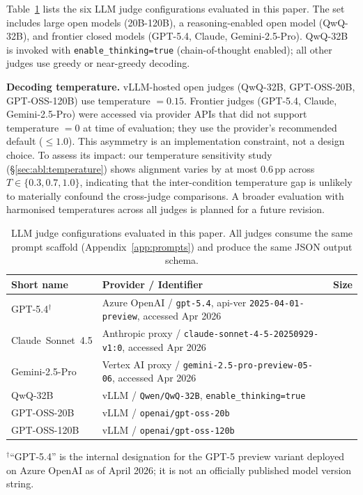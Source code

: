 Table~\ref{tab:judges} lists the six LLM judge configurations evaluated in this paper. The set includes large open models (20B-120B), a reasoning-enabled open model (QwQ-32B), and frontier closed models (GPT-5.4, Claude, Gemini-2.5-Pro). QwQ-32B is invoked with \texttt{enable\_thinking=true} (chain-of-thought enabled); all other judges use greedy or near-greedy decoding.

\textbf{Decoding temperature.} vLLM-hosted open judges (QwQ-32B, GPT-OSS-20B, GPT-OSS-120B) use temperature $=0.15$. Frontier judges (GPT-5.4, Claude, Gemini-2.5-Pro) were accessed via provider APIs that did not support temperature $=0$ at time of evaluation; they use the provider's recommended default ($\leq 1.0$). This asymmetry is an implementation constraint, not a design choice. To assess its impact: our temperature sensitivity study (\S\ref{sec:abl:temperature}) shows alignment varies by at most $0.6$\,pp across $T \in \{0.3, 0.7, 1.0\}$, indicating that the inter-condition temperature gap is unlikely to materially confound the cross-judge comparisons. A broader evaluation with harmonised temperatures across all judges is planned for a future revision.

\begin{table}[!htbp]
\centering
\caption{LLM judge configurations evaluated in this paper. All judges consume the same prompt scaffold (Appendix~\ref{app:prompts}) and produce the same JSON output schema.}
\label{tab:judges}
\small
\renewcommand{\arraystretch}{1.1}
\setlength{\tabcolsep}{5pt}
\begin{tabular}{@{}lll@{}}
\toprule
\textbf{Short name} & \textbf{Provider / Identifier} & \textbf{Size} \\
\midrule
GPT-5.4$^{\dagger}$ & Azure OpenAI / \texttt{gpt-5.4}, api-ver \texttt{2025-04-01-preview}, accessed Apr 2026 \\
Claude~Sonnet~4.5  & Anthropic proxy / \texttt{claude-sonnet-4-5-20250929-v1:0}, accessed Apr 2026         \\
Gemini-2.5-Pro     & Vertex AI proxy / \texttt{gemini-2.5-pro-preview-05-06}, accessed Apr 2026            \\
QwQ-32B            & vLLM / \texttt{Qwen/QwQ-32B}, \texttt{enable\_thinking=true}                         \\
GPT-OSS-20B        & vLLM / \texttt{openai/gpt-oss-20b}                                                   \\
GPT-OSS-120B       & vLLM / \texttt{openai/gpt-oss-120b}                                                  \\
\bottomrule
\end{tabular}
\begin{flushleft}
\footnotesize $^{\dagger}$``GPT-5.4'' is the internal designation for the GPT-5 preview variant deployed on Azure OpenAI as of April 2026; it is not an officially published model version string.
\end{flushleft}
\end{table}

